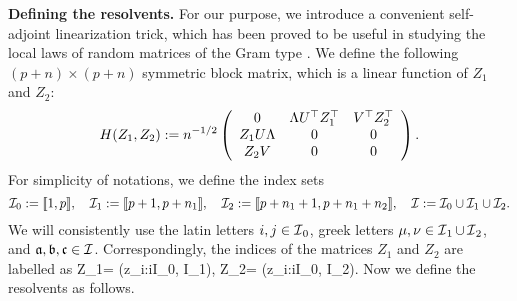 \medskip
\noindent\textbf{Defining the resolvents.} For our purpose, we introduce a convenient self-adjoint linearization trick, 
which has been proved to be useful in studying the local laws of random matrices of the Gram type \cite{Anisotropic, AEK_Gram, XYY_circular,DY20201}. We define the following $(p+n)\times (p+n)$ symmetric block matrix, which is a linear function of $Z_1$ and $Z_2$:
 \begin{equation}\label{linearize_block}
    H(Z_1,Z_2): = n^{-1/2}\left( {\begin{array}{*{20}c}
   { 0 } & \Lambda U^{\top}Z_1^\top & V^\top Z_2^\top  \\
   {Z_1 U\Lambda  } & {0} & 0 \\
   {Z_2V} & 0 & 0
   \end{array}} \right).
 \end{equation}
For simplicity of notations, we define the index sets
$$\cal I_0:=\llbracket 1,p\rrbracket, \quad  \cal I_1:=\llbracket p+1,p+n_1\rrbracket, \quad \cal I_2:=\llbracket p+n_1+1,p+n_1+n_2\rrbracket ,\quad \cal I:=\cal I_0\cup \cal I_1\cup \cal I_2  .$$
 We will consistently use the latin letters $i,j\in\sI_{0}$, greek letters $\mu,\nu\in\sI_{1}\cup \sI_{2}$, and $\fa,\fb,\mathfrak c\in \cal I$. Correspondingly, the indices of the matrices $Z_1$ and $Z_2$ are labelled as 
 \be\label{labelZ}
 Z_1= (z_{\mu i}:i\in \mathcal I_0, \mu \in \mathcal I_1), \quad Z_2= (z_{\nu i}:i\in \mathcal I_0, \nu \in \mathcal I_2).\ee
Now we define the resolvents as follows. 
